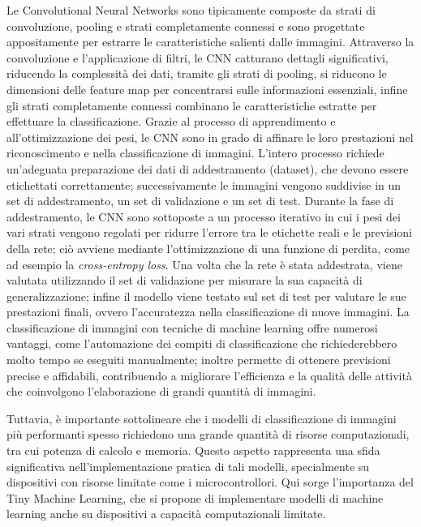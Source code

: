 Le Convolutional Neural Networks sono tipicamente composte da strati di convoluzione, pooling e strati completamente connessi e sono progettate appositamente per estrarre le caratteristiche salienti dalle immagini. Attraverso la convoluzione e l'applicazione di filtri, le CNN catturano dettagli significativi, riducendo la complessità dei dati, tramite gli strati di pooling, si riducono le dimensioni delle feature map per concentrarsi sulle informazioni essenziali, infine gli strati completamente connessi combinano le caratteristiche estratte per effettuare la classificazione. Grazie al processo di apprendimento e all'ottimizzazione dei pesi, le CNN sono in grado di affinare le loro prestazioni nel riconoscimento e nella classificazione di immagini.
L'intero processo richiede un'adeguata preparazione dei dati di addestramento (dataset), che devono essere etichettati correttamente; successivamente le immagini vengono suddivise in un set di addestramento, un set di validazione e un set di test. Durante la fase di addestramento, le CNN sono sottoposte a un processo iterativo in cui i pesi dei vari strati vengono regolati per ridurre l'errore tra le etichette reali e le previsioni della rete; ciò avviene mediante l'ottimizzazione di una funzione di perdita, come ad esempio la \textit{cross-entropy loss}.
%
Una volta che la rete è stata addestrata, viene valutata utilizzando il set di validazione per misurare la sua capacità di generalizzazione; infine il modello viene testato sul set di test per valutare le sue prestazioni finali, ovvero l'accuratezza nella classificazione di nuove immagini.
%
La classificazione di immagini con tecniche di machine learning offre numerosi vantaggi, come l'automazione dei compiti di classificazione che richiederebbero molto tempo se eseguiti manualmente; inoltre permette di ottenere previsioni precise e affidabili, contribuendo a migliorare l'efficienza e la qualità delle attività che coinvolgono l'elaborazione di grandi quantità di immagini.

Tuttavia, è importante sottolineare che i modelli di classificazione di immagini più performanti spesso richiedono una grande quantità di risorse computazionali, tra cui potenza di calcolo e memoria. Questo aspetto rappresenta una sfida significativa nell'implementazione pratica di tali modelli, specialmente su dispositivi con risorse limitate come i microcontrollori.
Qui sorge l'importanza del Tiny Machine Learning, che si propone di implementare modelli di machine learning anche su dispositivi a capacità computazionali limitate.

